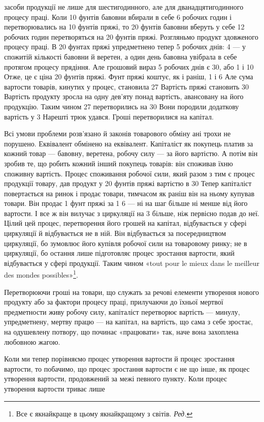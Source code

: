 \parcont{}  %
засоби продукції не лише для шестигодинного, але для дванадцятигодинного
процесу праці. Коли 10 фунтів бавовни вбирали
в себе 6 робочих годин і перетворювались на 10 фунтів пряжі, то
20 фунтів бавовни вберуть у себе 12 робочих годин  перетворяться
на 20 фунтів пряжі. Розгляньмо продукт здовженого процесу
праці. В 20 фунтах пряжі упредметнено тепер 5 робочих днів:
4 — у спожитій кількості бавовни й веретен, а один день бавовна
увібрала в себе протягом процесу прядіння. Але грошовий вираз
5 робочих днів є 30, або 1 і 10
Отже, це є ціна 20 фунтів пряжі. Фунт пряжі коштує, як і
раніш, 1 і 6 Але сума вартости товарів, кинутих у
процес, становила 27 Вартість пряжі становить 30
Вартість продукту зросла на одну дев’яту понад вартість,
авансовану на його продукцію. Таким чином 27 перетворились
на 30 Вони породили додаткову вартість
у 3 Нарешті трюк удався. Гроші перетворилися
на капітал.

Всі умови проблеми розв’язано й законів товарового обміну
ані трохи не порушено. Еквівалент обмінено на еквівалент.
Капіталіст як покупець платив за кожний товар — бавовну,
веретена, робочу силу — за його вартістю. А потім він зробив
те, що робить кожний інший покупець товарів: він споживав
їхню споживну вартість. Процес споживання робочої сили, який
разом з тим є процес продукції товару, дав продукт у 20 фунтів
пряжі вартістю в 30 Тепер капіталіст повертається
на ринок і продає товари, тимчасом як раніш він на ньому
купував товари. Він продає 1 фунт пряжі за 1 6 —
ні на шаг більше ні менше від його вартости. І все ж він вилучає
з циркуляції на 3 більше, ніж первісно подав до неї.
Цілий цей процес, перетворення його грошей на капітал, відбувається
у сфері циркуляції й відбувається не в ній. Він відбувається
за посередництвом циркуляції, бо зумовлює його купівля
робочої сили на товаровому ринку; не в циркуляції, бо остання
лише підготовляє процес зростання вартости, який відбувається
у сфері продукції. Таким чином «tout pour le mieux dans le meilleur
des mondes possibles»\footnote*{
Все є якнайкраще в цьому якнайкращому з світів. \emph{Ред.}
}.

Перетворюючи гроші на товари, що служать за речові
елементи утворення нового продукту або за фактори процесу
праці, прилучаючи до їхньої мертвої предметности живу робочу
силу, капіталіст перетворює вартість — минулу, упредметнену,
мертву працю — на капітал, на вартість, що сама з себе зростає,
на одушевлену потвору, що починає «працювати» так, наче вона
захоплена любовною жагою.

Коли ми тепер порівняємо процес утворення вартости й процес
зростання вартости, то побачимо, що процес зростання вартости є
не що інше, як процес утворення вартости, продовжений за межі
певного пункту. Коли процес утворення вартости триває лише
\parbreak{}  %
